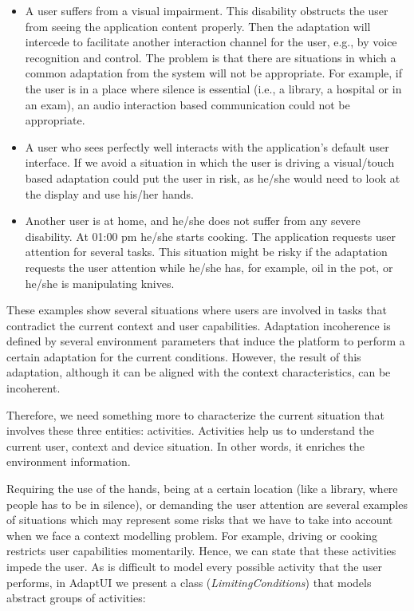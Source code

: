 \begin{itemize}
 \item A user suffers from a visual impairment. This disability obstructs
 the user from seeing the application content properly. Then the adaptation
 will intercede to facilitate another interaction channel for the user, e.g.,
 by voice recognition and control. The problem is that there are situations
 in which a common adaptation from the system will not be appropriate.
 For example, if the user is in a place where silence is essential (i.e., a
 library, a hospital or in an exam), an audio interaction based communication
 could not be appropriate. 
 
 \item A user who sees perfectly well interacts with the application's
 default user interface. If we avoid a situation in which the user is driving
 a visual/touch based adaptation could put the user in risk, as he/she would
 need to look at the display and use his/her hands.
 
 \item Another user is at home, and he/she does not suffer from any severe
 disability. At 01:00 pm he/she starts cooking. The application requests
 user attention for several tasks. This situation might be risky if the adaptation
 requests the user attention while he/she has, for example, oil in the pot, or
 he/she is manipulating knives.
\end{itemize}

These examples show several situations where users are involved in tasks that
contradict the current context and user capabilities. Adaptation incoherence is
defined by several environment parameters that induce the platform to perform a
certain adaptation for the current conditions. However, the result of this
adaptation, although it can be aligned with the context characteristics, can be
incoherent.

Therefore, we need something more to characterize the current situation that
involves these three entities: activities. Activities help us to understand the
current user, context and device situation. In other words, it enriches the
environment information.

Requiring the use of the hands, being at a certain location (like a library, where
people has to be in silence), or demanding the user attention are several examples
of situations which may represent some risks that we have to take into account
when we face a context modelling problem. For example, driving or cooking restricts
user capabilities momentarily. Hence, we can state that these activities impede
the user. As is difficult to model every possible activity that the user performs,
in AdaptUI we present a class (\textit{LimitingConditions}) that models abstract
groups of activities:

